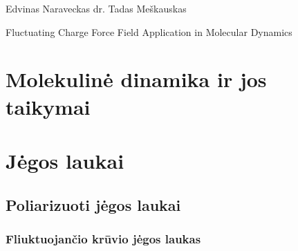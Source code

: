 \documentclass[a4paper,12pt,fleqn,tikz]{article}
\begin{document}
    {Edvinas Naraveckas}
    {}{}{}{}%
    {dr. Tadas Meškauskas}

    \tableofcontents



    \bothabstracts{}%
    {Fluctuating Charge Force Field Application in Molecular Dynamics} %
    {}%


    



    \newpage
    \section{Molekulinė dinamika ir jos taikymai}
    \label{sec:molecular_dynamics_section}
    


    \newpage
    \section{Jėgos laukai}
    \label{sec:force_field}
    


    \subsection{Poliarizuoti jėgos laukai}
    \label{sec:polarized_force_fields}
    


    \subsubsection{Fliuktuojančio krūvio jėgos laukas}
    \label{sec:fluctuating_charge}
    



    \newpage
\end{document}
